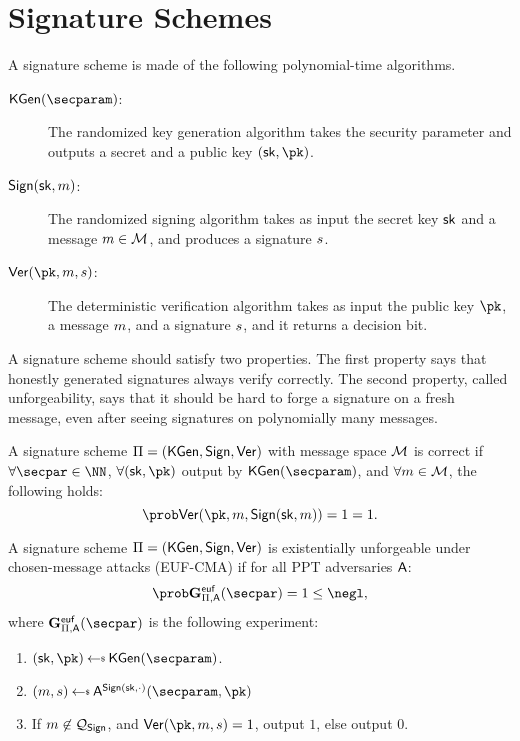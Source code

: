 \section{Signature Schemes}

A signature scheme is made of the following polynomial-time algorithms.

\begin{description}
    \item[$\kgen(\secparam)$:] The randomized key generation algorithm takes the security parameter  and  outputs a secret and a public key $(\sk, \pk)$.

    \item[$\mathsf{Sign}(\mathsf{sk}, m)$:] The randomized signing algorithm takes as input the secret key $\mathsf{sk}$ and a message $m\in\mathcal{M}$, and produces a signature $s$.

    \item[$\ver(\pk, \msg,\signature)$:] The deterministic verification algorithm takes as input the public key $\pk$, a message $m$, and a signature $s$, and it returns a decision bit.
\end{description}

A signature scheme should satisfy two properties. The first property says that honestly generated signatures always verify correctly. The second property, called unforgeability, says that it should be hard to forge a signature on a fresh message, even after seeing signatures on polynomially many messages.

\begin{definition} \label{def:Sigcorrectness}
    A signature scheme $\Pi= (\mathsf{KGen}, \allowbreak \mathsf{Sign}, \mathsf{Ver})$ with message space $\mathcal{M}$ is correct if $\forall\secpar\in\NN$, $\forall (\sk, \pk)$ output by $\kgen(\allowbreak\secparam)$, and $\forall m \in \mathcal{M}$, the following holds:
    \[
        \Prob{\ver(\pk, \msg,\sign(\sk, \msg)) = 1} = 1.
    \]
\end{definition}

\begin{definition} \label{def:SigUnforgeability}
    A signature scheme $\Pi= (\allowbreak\mathsf{KGen}, \allowbreak \mathsf{Sign}, \mathsf{Ver})$ is existentially unforgeable under chosen-message attacks (EUF-CMA) if for all PPT adversaries $\mathsf{A}$:
    \[
        \Prob{\Sigeufgame_{\Pi,\adversary}(\secpar) = 1} \leq \negl,
    \]
    where $\Sigeufgame_{\Pi,\adversary}(\secpar)$ is the following experiment:
    \begin{enumerate}
        \item $(\sk, \pk) \getsr \kgen(\secparam)$.
        \item $(\msg, \signature) \getsr \adversary^{\sign(\sk, \cdot)}(\secparam, \pk)$
        \item If $m \not\in \mathcal{Q}_{\mathsf{Sign}}$, and $\ver(\pk,\msg, \signature) = 1$, output $1$, else output $0$.
    \end{enumerate}
\end{definition}